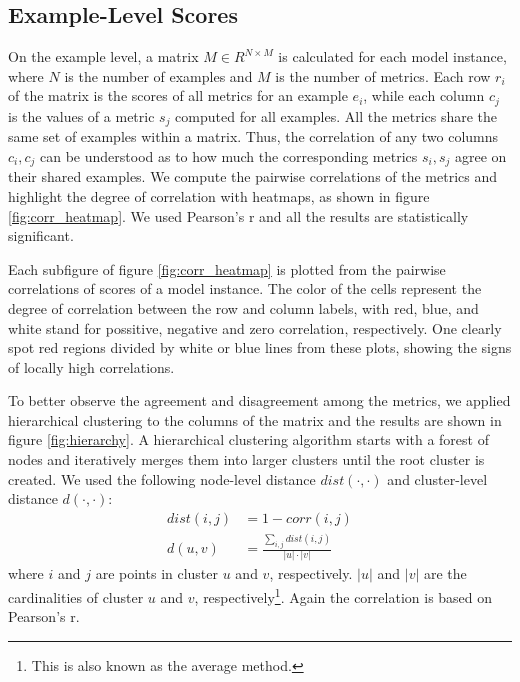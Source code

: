 \documentclass[runningheads]{llncs}
\begin{document}
    \subsection{Example-Level Scores}
    
    On the example level, a matrix $M \in R^{N \times M}$ is calculated for each model instance, where $N$ is the number of examples and $M$ is the number of metrics. Each row $r_i$ of the matrix is the scores of all metrics for an example $e_i$, while each column $c_j$ is the values of a metric $s_j$ computed for all examples. All the metrics share the same set of examples within a matrix. Thus, the correlation of any two columns $c_i, c_j$ can be understood as to how much the corresponding metrics $s_i, s_j$ agree on their shared examples. We compute the pairwise correlations of the metrics and highlight the degree of correlation with heatmaps, as shown in figure \ref{fig:corr_heatmap}. We used Pearson's r and all the results are statistically significant.

    Each subfigure of figure \ref{fig:corr_heatmap} is plotted from the pairwise correlations of scores of a model instance. The color of the cells represent the degree of correlation between the row and column labels, with red, blue, and white stand for possitive, negative and zero correlation, respectively. One clearly spot red regions divided by white or blue lines from these plots, showing the signs of locally high correlations.

    To better observe the agreement and disagreement among the metrics, we applied hierarchical clustering to the columns of the matrix and the results are shown in figure \ref{fig:hierarchy}. A hierarchical clustering algorithm starts with a forest of nodes and iteratively merges them into larger clusters until the root cluster is created. We used the following node-level distance $\textit{dist}(\cdot, \cdot)$ and cluster-level distance $d(\cdot, \cdot)$:
    \begin{align}
        \textit{dist}(i, j) &= 1 - \textit{corr}(i, j) \\
        d(u, v) &= \frac{\sum_{i,j}\textit{dist}(i, j)}{|u| \cdot |v|}
    \end{align}
    where $i$ and $j$ are points in cluster $u$ and $v$, respectively. $|u|$ and $|v|$ are the cardinalities of cluster $u$ and $v$, respectively\footnote{This is also known as the average method.}. Again the correlation is based on Pearson's r.
\end{document}
